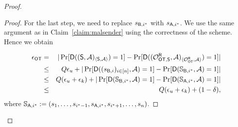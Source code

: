\begin{proof}
\begin{proof}
For the last step, we need to replace $s_{\mathsf{B},i^*}$ with $s_{\mathsf{A},i^*}$. We use the same argument as in Claim~\ref{claim:malsender} using the correctness of the scheme. Hence we obtain

\begin{eqnarray*}
\epsilon_{\mathsf{OT}} &=&|\Pr[\mathsf D((\mathsf{S}, \mathcal{A})_{\langle \mathsf{S}, \mathcal{A}\rangle})=1] -\Pr[\mathsf D((\mathcal{O}_{\mathsf{OT},\mathsf{S}}^\mathsf{R},\mathcal{A})_{\langle \mathcal{O}_{\mathsf{OT}}^\mathsf{R} , \mathcal{A} \rangle})=1]|\\
&\leq & Q\epsilon_{u}+|\Pr[\mathsf D((s_{\mathsf{B},i})_{i\in[n]},\mathcal{A})=1]-\Pr[\mathsf D(\mathsf{\mathbb S}_{\mathsf{B},i^*}, \mathcal{A})=1]|\\
&\leq & Q(\epsilon_{u}+\epsilon_{k})+|\Pr[\mathsf D(\mathsf{\mathbb S}_{\mathsf{B},i^*},\mathcal{A})=1]-\Pr[\mathsf D(\mathsf{\mathbb S}_{\mathsf{A},i^*}, \mathcal{A})=1]|\\
&\leq &Q(\epsilon_{u}+\epsilon_{k})+(1-\delta),
\end{eqnarray*}
where $\mathsf{\mathbb S}_{\mathsf{A},i^*}:=(s_{1},\dots, s_{i^*-1},s_{\mathsf{A},i^*},s_{i^*+1},\dots, s_{n})$.
\end{proof}

\end{proof}
